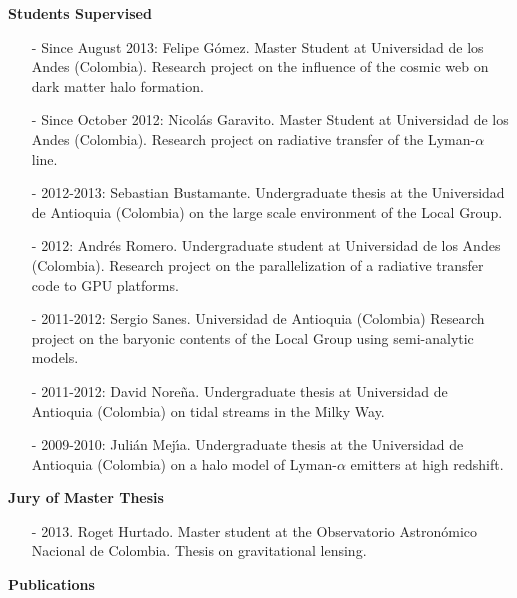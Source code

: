 \documentclass[9pt]{article}
\begin{document}
{\bf Students Supervised}
\begin{itemize}

\item[-] Since August 2013: Felipe G\'omez. Master Student at
  Universidad de los Andes (Colombia). Research project on the
  influence of the cosmic web on dark matter halo formation. 
\item[-] Since October 2012: Nicol\'as Garavito. Master Student
  at Universidad de los Andes (Colombia). Research project on
  radiative transfer of the  Lyman-$\alpha$ line.  
\item[-] 2012-2013: Sebastian Bustamante. Undergraduate thesis at the
  Universidad de Antioquia (Colombia) on the large scale environment
  of the Local Group. 
\item[-] 2012: Andr\'es Romero. Undergraduate student at Universidad
  de los Andes (Colombia). Research project on the parallelization of
  a radiative transfer code to GPU platforms. 
\item[-] 2011-2012: Sergio Sanes.
  Universidad de Antioquia (Colombia) Research project on the baryonic contents of the
  Local Group using semi-analytic models. 
\item[-]2011-2012: David Nore\~na. Undergraduate thesis at Universidad
  de Antioquia (Colombia) on tidal streams in the Milky Way. 
\item[-]2009-2010: Juli\'an Mej\'{\i}a. Undergraduate thesis at the
  Universidad de Antioquia (Colombia) on a halo model of
  Lyman-$\alpha$ emitters at high redshift. 
\end{itemize}


{\bf Jury of Master Thesis}
\begin{itemize}
\item[-] 2013. Roget Hurtado. Master student at the Observatorio Astron\'omico Nacional de Colombia. Thesis on gravitational lensing.
\end{itemize}

{\bf Publications}\\
\end{document}
